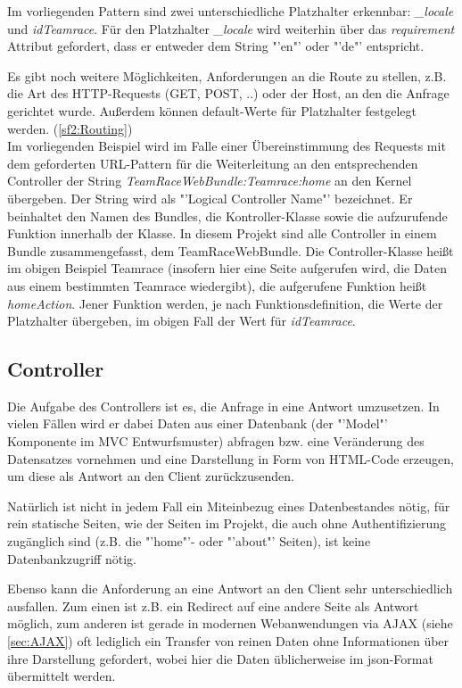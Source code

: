 \documentclass[12pt]{report}
\begin{document}
Im vorliegenden Pattern sind zwei unterschiedliche Platzhalter erkennbar: \emph{\_locale} und \emph{idTeamrace}. Für den Platzhalter \emph{\_locale} wird weiterhin über das \emph{requirement} Attribut gefordert, dass er entweder dem String "'en"' oder "'de"' entspricht.

Es gibt noch weitere Möglichkeiten, Anforderungen an die Route zu stellen, z.B. die Art des HTTP-Requests (GET, POST, ..) oder der Host, an den die Anfrage gerichtet wurde. Außerdem können default-Werte für Platzhalter festgelegt werden. (\ref{sf2:Routing})\\

Im vorliegenden Beispiel wird im Falle einer Übereinstimmung des Requests mit dem geforderten URL-Pattern für die Weiterleitung an den entsprechenden Controller der String \emph{TeamRaceWebBundle:Teamrace:home} an den Kernel übergeben. Der String wird als "'Logical Controller Name"' bezeichnet. Er beinhaltet den Namen des Bundles, die Kontroller-Klasse sowie die aufzurufende Funktion innerhalb der Klasse. In diesem Projekt sind alle Controller in einem Bundle zusammengefasst, dem TeamRaceWebBundle. Die Controller-Klasse heißt im obigen Beispiel Teamrace (insofern hier eine Seite aufgerufen wird, die Daten aus einem bestimmten Teamrace wiedergibt), die aufgerufene Funktion heißt \emph{homeAction}. Jener Funktion werden, je nach Funktionsdefinition, die Werte der Platzhalter übergeben, im obigen Fall der Wert für \emph{idTeamrace}.

\subsection{Controller}
Die Aufgabe des Controllers ist es, die Anfrage in eine Antwort umzusetzen. In vielen Fällen wird er dabei Daten aus einer Datenbank (der "'Model"' Komponente im MVC Entwurfsmuster) abfragen bzw. eine Veränderung des Datensatzes vornehmen und eine Darstellung in Form von HTML-Code erzeugen, um diese als Antwort an den Client zurückzusenden.

Natürlich ist nicht in jedem Fall ein Miteinbezug eines Datenbestandes nötig, für rein statische Seiten, wie der Seiten im Projekt, die auch ohne Authentifizierung zugänglich sind (z.B. die "'home"'- oder "'about"' Seiten), ist keine Datenbankzugriff nötig.

Ebenso kann die Anforderung an eine Antwort an den Client sehr unterschiedlich ausfallen. Zum einen ist z.B. ein Redirect auf eine andere Seite als Antwort möglich, zum anderen ist gerade in modernen Webanwendungen via AJAX (siehe \ref{sec:AJAX}) oft lediglich ein Transfer von reinen Daten ohne Informationen über ihre Darstellung gefordert, wobei hier die Daten üblicherweise im json-Format übermittelt werden.\\
\end{document}
